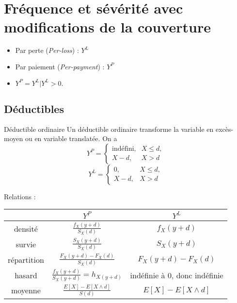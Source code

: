 \chapter{Fréquence et sévérité avec modifications de la couverture}

\begin{itemize}
	\item Par perte (\textit{Per-loss}) : $Y^L$
	\item Par paiement (\textit{Per-payment}) : $Y^P$
	\item $Y^P = Y^L \vert Y^L > 0.$
\end{itemize}

\section{Déductibles}

\begin{definition}{Déductible ordinaire}{}
	Un déductible ordinaire transforme la variable en excès-moyen ou en variable translatée. On a 
	$$Y^P = \begin{cases}
	\text{indéfini},& X\leq d,\\
	X - d,& X > d
	\end{cases}$$
	$$Y^L = \begin{cases}
	0,& X\leq d,\\
	X - d,& X > d
	\end{cases}$$
\end{definition}

Relations : 

\begin{center}
	\begin{tabular}{ccc}
		\hline
		&                              $Y^P$                               &                  $Y^L$                  \\ \hline
		densité   &          $\displaystyle \frac{f_{X}(y + d)}{S_{X}(d)}$           &      $\displaystyle f_{X}(y + d)$       \\
		survie    &          $\displaystyle \frac{S_{X}(y + d)}{S_{X}(d)}$           &      $\displaystyle S_{X}(y + d)$       \\
		répartition &     $\displaystyle \frac{F_{X}(y + d) - F_{X}(d)}{S_{X}(d)}$     & $\displaystyle F_{X}(y + d) - F_{X}(d)$ \\
		hasard    & $\displaystyle \frac{f_{X}(y + d)}{S_{X}(y + d)} = h_{X(y + d)}$ &      indéfinie à 0, donc indéfinie      \\
		moyenne   &        $\displaystyle \frac{E[X] - E[X \wedge d]}{S(d)}$         &  $\displaystyle E[X] - E[X \wedge d]$   \\ \hline
	\end{tabular}
\end{center}

